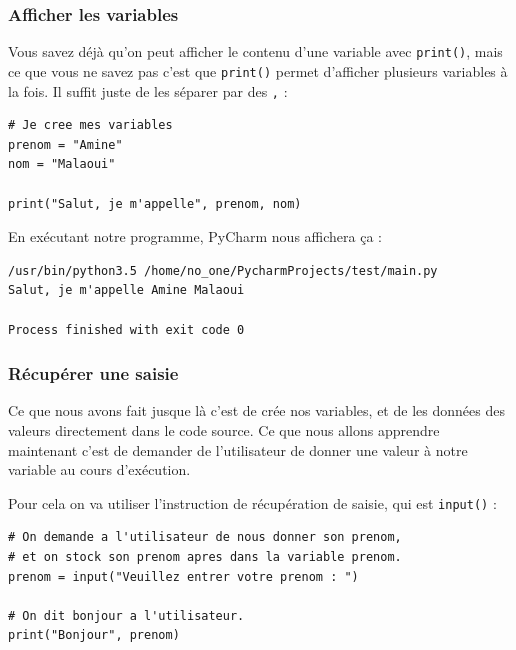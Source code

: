 \documentclass[12pt]{article}
\newcommand{\code}[1]{\colorbox{light-gray}{\texttt{#1}}}
\begin{document}
        \subsubsection{Afficher les variables}
            Vous savez déjà qu'on peut afficher le contenu d'une variable avec \code{print()}, mais ce que vous
            ne savez pas c'est que \code{print()} permet d'afficher plusieurs variables à la fois. Il suffit
            juste de les séparer par des \code{,} :
            \begin{lstlisting}[style=code]
# Je cree mes variables
prenom = "Amine"
nom = "Malaoui"

print("Salut, je m'appelle", prenom, nom)
            \end{lstlisting}

            En exécutant notre programme, PyCharm nous affichera ça :

            \begin{lstlisting}[style=exec_result]
/usr/bin/python3.5 /home/no_one/PycharmProjects/test/main.py
Salut, je m'appelle Amine Malaoui

Process finished with exit code 0
            \end{lstlisting}

        \subsubsection{Récupérer une saisie}
            Ce que nous avons fait jusque là c'est de crée nos variables, et de les données des valeurs directement dans
            le code source. Ce que nous allons apprendre maintenant c'est de demander de l'utilisateur
            de donner une valeur à notre variable au cours d'exécution.

            Pour cela on va utiliser l'instruction de récupération de saisie, qui est \code{input()} :
            \begin{lstlisting}[style=code]
# On demande a l'utilisateur de nous donner son prenom,
# et on stock son prenom apres dans la variable prenom.
prenom = input("Veuillez entrer votre prenom : ")

# On dit bonjour a l'utilisateur.
print("Bonjour", prenom)
            \end{lstlisting}
\end{document}
